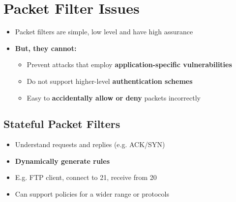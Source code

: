 \documentclass{article}
\begin{document}
\section{Packet Filter Issues}
\begin{itemize}
  \item Packet filters are simple, low level and have high assurance 
  \item \textbf{But, they cannot:}
\begin{itemize}
  \item Prevent attacks that employ \textbf{application-specific vulnerabilities} 
  \item Do not support higher-level \textbf{authentication schemes} 
  \item Easy to \textbf{accidentally allow or deny} packets incorrectly
\end{itemize}
\end{itemize}

\subsection{Stateful Packet Filters}
\begin{itemize}
  \item Understand requests and replies (e.g. ACK/SYN) 
  \item \textbf{Dynamically generate rules} 
  \item E.g. FTP client, connect to 21, receive from 20 
  \item Can support policies for a wider range or protocols
\end{itemize}
\end{document}
